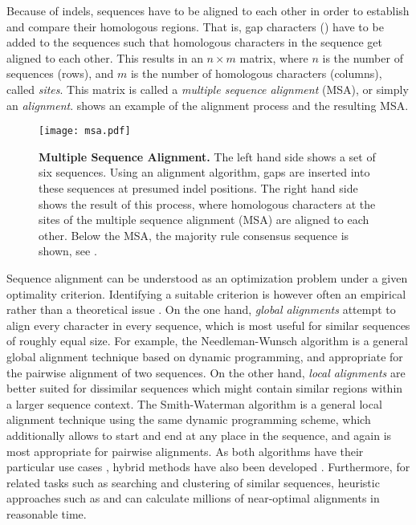 Because of indels, sequences have to be aligned to each other in order to establish and compare their homologous regions.
That is, gap characters (\nucleobase{-}) have to be added to the sequences
such that homologous characters in the sequence get aligned to each other.
This results in an $n \times m$ matrix,
where $n$ is the number of sequences (rows),
and $m$ is the number of homologous characters (columns), called \emph{sites}.
This matrix is called a \emph{multiple sequence alignment} (MSA), or simply an \emph{alignment}.
 shows an example of the alignment process and the resulting MSA.

\begin{figure}[hpbt]
    \centering
    \texttt{[image: msa.pdf]}
    \caption[Multiple Sequence Alignment]{
        \textbf{Multiple Sequence Alignment.}
        The left hand side shows a set of six sequences.
        Using an alignment algorithm, gaps are inserted into these sequences at presumed indel positions.
        The right hand side shows the result of this process,
        where homologous characters at the sites of the multiple sequence alignment (MSA) are aligned to each other.
        Below the MSA, the majority rule consensus sequence is shown,
        see .
    }
    \label{fig:msa}
\end{figure}

Sequence alignment can be understood as an optimization problem under a given optimality criterion.
Identifying a suitable criterion is however often an empirical rather than a theoretical issue \cite{Vingron1994,Carroll2007}.
On the one hand, \emph{global alignments} attempt to align every character in every sequence,
which is most useful for similar sequences of roughly equal size.
For example, the Needleman-Wunsch algorithm \cite{Needleman1970} is a general global alignment technique
based on dynamic programming, and appropriate for the pairwise alignment of two sequences.
On the other hand, \emph{local alignments} are better suited for dissimilar sequences
which might contain similar regions within a larger sequence context.
The Smith-Waterman algorithm \cite{Smith1981} is a general local alignment technique
using the same dynamic programming scheme,
which additionally allows to start and end at any place in the sequence,
and again is most appropriate for pairwise alignments.
As both algorithms have their particular use cases \cite{Polyanovsky2011},
hybrid methods have also been developed \cite{Brudno2003}.
Furthermore, for related tasks such as searching and clustering of similar sequences,
heuristic approaches such as  \cite{Altschul1990} and
 \cite{Edgar2010} can calculate millions of near-optimal alignments in reasonable time.

